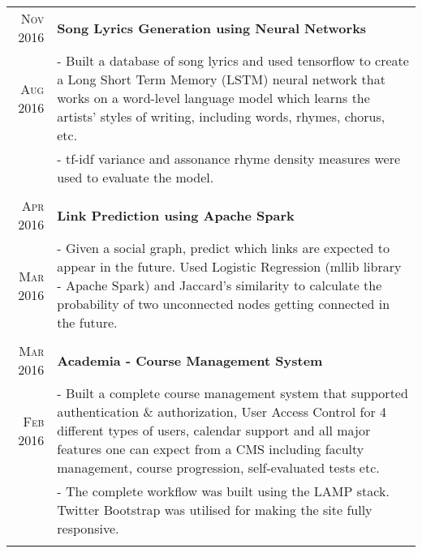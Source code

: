 \documentclass[a4paper,10pt]{extarticle} %
\begin{document}
\begin{tabular}{r|p{16cm}}

\textsc{\normalsize{Nov 2016}} & \textbf{\normalsize{Song Lyrics Generation using Neural Networks}}\\
\textsc{\normalsize{Aug 2016}} & \footnotesize{- Built a database of song lyrics and used tensorflow to create a Long Short Term Memory (LSTM) neural network that works on a word-level language model which learns the artists’ styles of writing, including words, rhymes, chorus, etc. }\\
& \footnotesize{- tf-idf variance and assonance rhyme density measures were used to evaluate the model.}\\
\multicolumn{2}{c}{} \\

\textsc{\normalsize{Apr 2016}} & \textbf{\normalsize{Link Prediction using Apache Spark}} \\

\textsc{\normalsize{Mar 2016}}  & \footnotesize{- Given a social graph, predict which links are expected to appear in the future. Used Logistic Regression (mllib library - Apache Spark) and Jaccard's similarity to calculate the probability of two unconnected nodes getting connected in the future.}\\
\multicolumn{2}{c}{} \\


\textsc{\normalsize{Mar 2016}} & \textbf{\normalsize{Academia - Course Management System}}\\
\textsc{\normalsize{Feb 2016}} & \footnotesize{- Built a complete course management system that supported authentication \& authorization, User Access Control for 4 different types of users, calendar support and all major features one can expect from a CMS including faculty management, course progression, self-evaluated tests etc. }\\
& \footnotesize{- The complete workflow was built using the LAMP stack. Twitter Bootstrap was utilised for making the site fully responsive.}\\
\multicolumn{2}{c}{} \\


\end{tabular}
\end{document}

